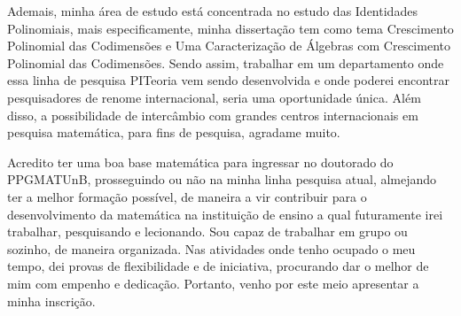 \documentclass[11pt]{article}
\begin{document}
Ademais, minha área de estudo está concentrada no estudo das Identidades Polinomiais, mais especificamente, minha dissertação tem como tema Crescimento Polinomial das Codimensões e Uma Caracterização de Álgebras com Crescimento Polinomial das Codimensões. Sendo assim, trabalhar em um departamento onde essa linha de pesquisa PITeoria vem sendo desenvolvida  e onde poderei encontrar pesquisadores de renome internacional, seria uma oportunidade única. Além disso, a possibilidade de intercâmbio com grandes centros internacionais em pesquisa matemática, para fins de pesquisa, agradame muito.

Acredito ter uma boa base matemática para ingressar no doutorado do PPGMATUnB, prosseguindo ou não na minha linha pesquisa atual, almejando ter a melhor formação possível, de maneira a vir contribuir para o desenvolvimento da matemática na instituição de ensino a qual futuramente irei trabalhar, pesquisando e lecionando. Sou capaz de trabalhar em grupo ou sozinho, de maneira organizada. Nas atividades onde tenho ocupado o meu tempo, dei provas de flexibilidade e de iniciativa, procurando dar o melhor de mim com empenho e dedicação. Portanto, venho por este meio apresentar a minha inscrição.
\end{document}
